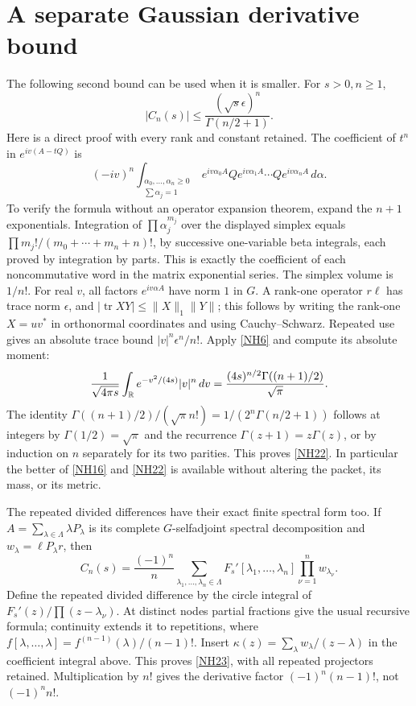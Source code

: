 \documentclass[11pt]{article}
\newcommand{\tr}{\operatorname{tr}}\newcommand{\dd}{\dagger_G}
\newcommand{\eps}{\epsilon}\newcommand{\spec}{\operatorname{spec}}
\begin{document}
\section{A separate Gaussian derivative bound}

The following second bound can be used when it is smaller.
For \(s>0,n\ge1\),
\begin{equation}\tag{NH22}\label{NH22}
|C_n(s)|\le
\frac{(\sqrt{s}\eps)^n}{\Gamma(n/2+1)} .
\end{equation}
Here is a direct proof with every rank and constant retained.
The coefficient of \(t^n\) in \(e^{iv(A-tQ)}\) is
\[
(-iv)^n\int_{\substack{\alpha_0,\ldots,\alpha_n\ge0\\
                       \sum\alpha_j=1}}
e^{iv\alpha_0A}Qe^{iv\alpha_1A}\cdots
Qe^{iv\alpha_nA}\,d\alpha .
\]
To verify the formula without an operator expansion theorem,
expand the \(n+1\) exponentials. Integration of
\(\prod\alpha_j^{m_j}\) over the displayed simplex equals
\(\prod m_j!/(m_0+\cdots+m_n+n)!\), by successive
one-variable beta integrals, each proved by integration
by parts. This is exactly the coefficient of each
noncommutative word in the matrix exponential series.
The simplex volume is \(1/n!\).
For real \(v\), all factors \(e^{iv\alpha A}\) have
norm \(1\) in \(G\). A rank-one operator \(r\ell\)
has trace norm \(\eps\), and
\(|\tr XY|\le\|X\|_1\|Y\|\); this follows by writing
the rank-one \(X=uv^*\) in orthonormal coordinates and
using Cauchy--Schwarz. Repeated use gives an absolute
trace bound \(|v|^n\eps^n/n!\).
Apply \eqref{NH6} and compute its absolute moment:
\[
\frac1{\sqrt{4\pi s}}\int_\mathbb R
e^{-v^2/(4s)}|v|^n\,dv
=\frac{(4s)^{n/2}\Gamma((n+1)/2)}{\sqrt\pi}.
\]
The identity
\(\Gamma((n+1)/2)/(\sqrt\pi n!)
=1/(2^n\Gamma(n/2+1))\) follows at integers by
\(\Gamma(1/2)=\sqrt\pi\) and the recurrence
\(\Gamma(z+1)=z\Gamma(z)\), or by induction on \(n\)
separately for its two parities.
This proves \eqref{NH22}. In particular the better of
\eqref{NH16} and \eqref{NH22} is available without
altering the packet, its mass, or its metric.

The repeated divided differences have their exact finite
spectral form too. If
\(A=\sum_{\lambda\in\Lambda}\lambda P_\lambda\) is its
complete \(G\)-selfadjoint spectral decomposition and
\(w_\lambda=\ell P_\lambda r\), then
\begin{equation}\tag{NH23}\label{NH23}
C_n(s)=\frac{(-1)^n}{n}
\sum_{\lambda_1,\ldots,\lambda_n\in\Lambda}
F_s'[\lambda_1,\ldots,\lambda_n]
\prod_{\nu=1}^n w_{\lambda_\nu}.
\end{equation}
Define the repeated divided difference by the circle
integral of \(F_s'(z)/\prod(z-\lambda_\nu)\).
At distinct nodes partial fractions give the usual
recursive formula; continuity extends it to repetitions,
where \(f[\lambda,\ldots,\lambda]=f^{(n-1)}(\lambda)/(n-1)!\).
Insert
\(\kappa(z)=\sum_\lambda w_\lambda/(z-\lambda)\)
in the coefficient integral above. This proves
\eqref{NH23}, with all repeated projectors retained.
Multiplication by \(n!\) gives the derivative factor
\((-1)^n(n-1)!\), not \((-1)^nn!\).
\end{document}
